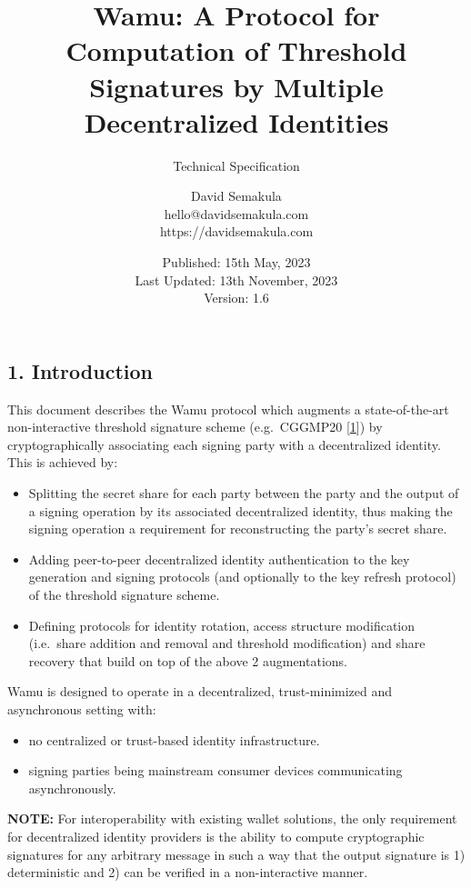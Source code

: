 \documentclass[
]{article}
\title{Wamu: A Protocol for Computation of Threshold Signatures by
Multiple Decentralized Identities}
\subtitle{Technical Specification}
\author{David Semakula\\
hello@davidsemakula.com\\
https://davidsemakula.com}
\date{Published: 15th May, 2023\\
Last Updated: 13th November, 2023\\
Version: 1.6}
\providecommand{\tightlist}{%
  \setlength{\itemsep}{0pt}\setlength{\parskip}{0pt}}
\begin{document}
\maketitle

{
\setcounter{tocdepth}{3}
\tableofcontents
}
\hypertarget{introduction}{%
\subsection{1. Introduction}\label{introduction}}

This document describes the Wamu protocol which augments a
state-of-the-art non-interactive threshold signature scheme
(e.g.~CGGMP20 {[}\protect\hyperlink{ref-cggmp20}{1}{]}) by
cryptographically associating each signing party with a decentralized
identity. This is achieved by:

\begin{itemize}
\tightlist
\item
  Splitting the secret share for each party between the party and the
  output of a signing operation by its associated decentralized
  identity, thus making the signing operation a requirement for
  reconstructing the party's secret share.
\item
  Adding peer-to-peer decentralized identity authentication to the key
  generation and signing protocols (and optionally to the key refresh
  protocol) of the threshold signature scheme.
\item
  Defining protocols for identity rotation, access structure
  modification (i.e.~share addition and removal and threshold
  modification) and share recovery that build on top of the above 2
  augmentations.
\end{itemize}

Wamu is designed to operate in a decentralized, trust-minimized and
asynchronous setting with:

\begin{itemize}
\tightlist
\item
  no centralized or trust-based identity infrastructure.
\item
  signing parties being mainstream consumer devices communicating
  asynchronously.
\end{itemize}

\textbf{NOTE:} For interoperability with existing wallet solutions, the
only requirement for decentralized identity providers is the ability to
compute cryptographic signatures for any arbitrary message in such a way
that the output signature is 1) deterministic and 2) can be verified in
a non-interactive manner.
\end{document}
